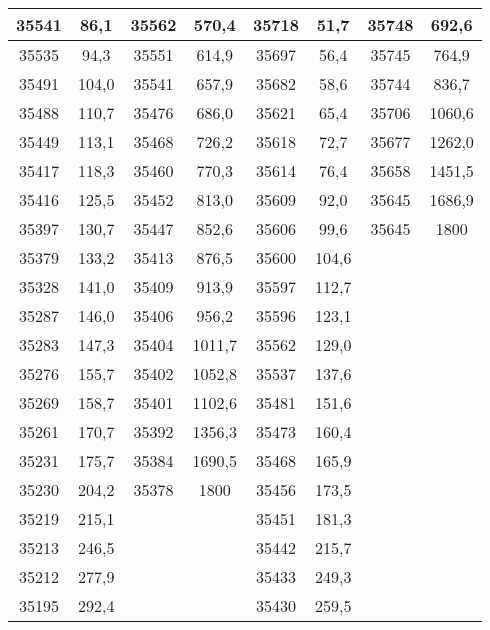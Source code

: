 \documentclass[11pt]{article}
\begin{document}
{{\begin{tabular}{|c|c|c|c|c|c|c|c|}
            \hline 
            35541 & 86,1 & 35562 & 570,4 & 35718 & 51,7 & \multicolumn{1}{c|}{35748} & \multicolumn{1}{c|}{692,6}\tabularnewline
            \hline 
            35535 & 94,3 & 35551 & 614,9 & 35697 & 56,4 & \multicolumn{1}{c|}{35745} & \multicolumn{1}{c|}{764,9}\tabularnewline
            \hline 
            35491 & 104,0 & 35541 & 657,9 & 35682 & 58,6 & \multicolumn{1}{c|}{35744} & \multicolumn{1}{c|}{836,7}\tabularnewline
            \hline 
            35488 & 110,7 & 35476 & 686,0 & 35621 & 65,4 & \multicolumn{1}{c|}{35706} & \multicolumn{1}{c|}{1060,6}\tabularnewline
            \hline 
            35449 & 113,1 & 35468 & 726,2 & 35618 & 72,7 & \multicolumn{1}{c|}{35677} & \multicolumn{1}{c|}{1262,0}\tabularnewline
            \hline 
            35417 & 118,3 & 35460 & 770,3 & 35614 & 76,4 & \multicolumn{1}{c|}{35658} & \multicolumn{1}{c|}{1451,5}\tabularnewline
            \hline 
            35416 & 125,5 & 35452 & 813,0 & 35609 & 92,0 & \multicolumn{1}{c|}{35645} & \multicolumn{1}{c|}{1686,9}\tabularnewline
            \hline 
            35397 & 130,7 & 35447 & 852,6 & 35606 & 99,6 & \multicolumn{1}{c|}{35645} & \multicolumn{1}{c|}{1800}\tabularnewline
            \hline 
            35379 & 133,2 & 35413 & 876,5 & 35600 & 104,6 &  & \tabularnewline
            \cline{1-6} 
            35328 & 141,0 & 35409 & 913,9 & 35597 & 112,7 &  & \tabularnewline
            \cline{1-6} 
            35287 & 146,0 & 35406 & 956,2 & 35596 & 123,1 &  & \tabularnewline
            \cline{1-6} 
            35283 & 147,3 & 35404 & 1011,7 & 35562 & 129,0 &  & \tabularnewline
            \cline{1-6} 
            35276 & 155,7 & 35402 & 1052,8 & 35537 & 137,6 &  & \tabularnewline
            \cline{1-6} 
            35269 & 158,7 & 35401 & 1102,6 & 35481 & 151,6 &  & \tabularnewline
            \cline{1-6} 
            35261 & 170,7 & 35392 & 1356,3 & 35473 & 160,4 &  & \tabularnewline
            \cline{1-6} 
            35231 & 175,7 & 35384 & 1690,5 & 35468 & 165,9 &  & \tabularnewline
            \cline{1-6} 
            35230 & 204,2 & 35378 & 1800 & 35456 & 173,5 &  & \tabularnewline
            \cline{1-6} 
            35219 & 215,1 & \multicolumn{1}{c}{} &  & 35451 & 181,3 &  & \tabularnewline
            \cline{1-2} \cline{5-6} 
            35213 & 246,5 & \multicolumn{1}{c}{} &  & 35442 & 215,7 &  & \tabularnewline
            \cline{1-2} \cline{5-6} 
            35212 & 277,9 & \multicolumn{1}{c}{} &  & 35433 & 249,3 &  & \tabularnewline
            \cline{1-2} \cline{5-6} 
            35195 & 292,4 & \multicolumn{1}{c}{} &  & 35430 & 259,5 &  & \tabularnewline

\end{tabular}}}
\end{document}
